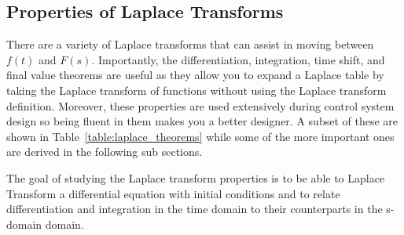 \documentclass[12pt,letter]{article}
\numberwithin{ex}{section} %
\numberwithin{re}{section} %
\numberwithin{equation}{section}	%
\begin{document}
\subsection{Properties of Laplace Transforms}


There are a variety of Laplace transforms that can assist in moving between $f(t)$ and $F(s)$. Importantly, the differentiation, integration, time shift, and final value theorems are useful as they allow you to expand a Laplace table by taking the Laplace transform of functions without using the Laplace transform definition. Moreover, these properties are used extensively during control system design so being fluent in them makes you a better designer. A subset of these are shown in Table~\ref{table:laplace_theorems} while some of the more important ones are derived in the following sub sections. 

The goal of studying the Laplace transform properties is to be able to Laplace Transform a differential equation with initial conditions and to relate differentiation and integration in the time domain to their counterparts in the s-domain domain. 
\end{document}
